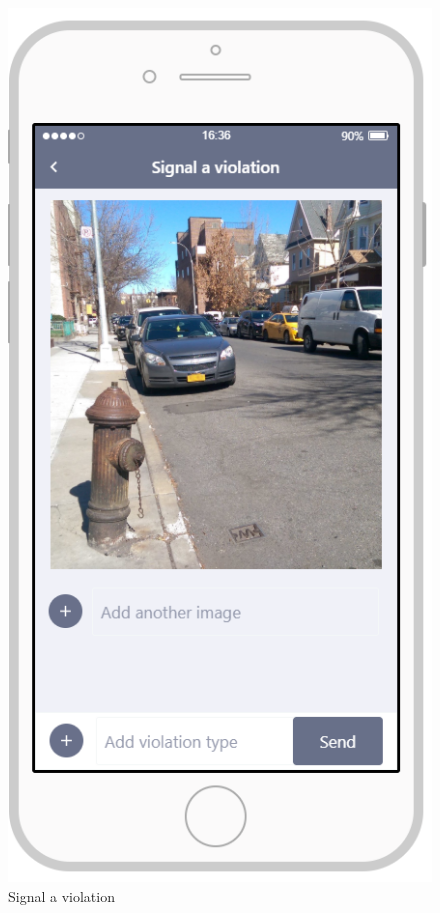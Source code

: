 \documentclass{article}
\begin{document}
\begin{figure}[H]
    \centering
    \includegraphics[scale=0.7]{Images/SignalAViolationAPP}
    \caption{Signal a violation}
\end{figure}
\end{document}

